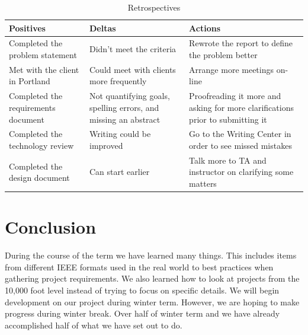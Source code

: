\documentclass[journal,compsoc, 10pt, draftclsnofoot, onecolumn]{IEEEtran}
\begin{document}
\begin{table}[!ht]
\centering
\caption{Retrospectives}
\label{my-label}
\begin{tabularx}{\textwidth}{X|X|X}
\hline
\textbf{Positives} & \textbf{Deltas} & \textbf{Actions} \\ \hline
Completed the problem statement                  &  Didn't meet the criteria                &Rewrote the report to define the problem better                 \\ \hline
Met with the client in Portland                  &     Could meet with clients more frequently            & Arrange more meetings on-line                 \\ \hline
Completed the requirements document                  & Not quantifying goals, spelling errors, and missing an abstract                & Proofreading it more and asking for more clarifications prior to submitting it                 \\ \hline
Completed the technology review                 & Writing could be improved                & Go to the Writing Center in order to see missed mistakes                 \\ \hline
Completed the design document                  & Can start earlier                 &Talk more to TA and instructor on clarifying some matters                  \\ \hline
\end{tabularx}
\end{table}

\FloatBarrier
\section{Conclusion}
During the course of the term we have learned many things. This includes items 
from different IEEE formats used in the real world to best practices when gathering 
project requirements. We also learned how to look at projects from the 10,000 
foot level instead of trying to focus on specific details. We will begin development 
on our project during winter term. However, we are hoping to make progress 
during winter break. Over half of winter term and we have already accomplished 
half of what we have set out to do. 
\end{document}
